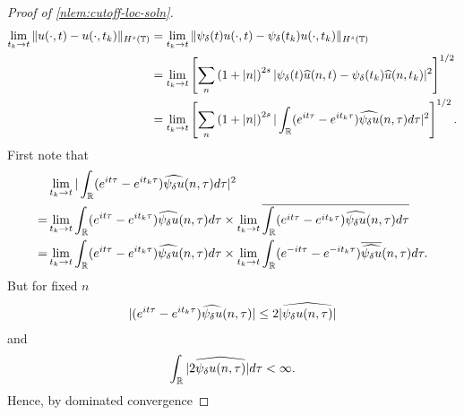 \begin{proof}[Proof of \cref{nlem:cutoff-loc-soln}]
%
%
\begin{equation}
  \label{ndm}
	\begin{split}
		\lim_{t_{k} \to t} \|u(\cdot, t) - u(\cdot, t_{k})\|_{H^s(\mathbb{T})} 
    & = \lim_{t_{k} \to t} \|\psi_{\delta}(t) u(\cdot, t) - \psi_{\delta}(t_{k}) u(\cdot, t_{k})\|_{H^s(\mathbb{T})} 
		\\
		& = \lim_{t_{k} \to t} \left[ \sum_{n}\left( 1 + | n |
    \right)^{2s} | \psi_{\delta}(t)  \widehat{u}(n, t) - \psi_{\delta}(t_{k}) \widehat{ u}(n, t_{k}) |^2 \right]^{1/2}
		\\
		& = \lim_{t_{k} \to t} \left[ \sum_{n} \left( 1 + | n |
    \right)^{2s} | \int_{\mathbb{R}} (e^{it \tau} - e^{it_{k} \tau})
    \widehat{\psi_{\delta} u}(n,
		\tau) d \tau |^2 \right]^{1/2}.
	\end{split}
\end{equation}
First note that
%
%
%
%
\begin{equation*}
\begin{split}
& \lim_{t_{k} \to t}  | \int_{\mathbb{R}} (e^{it \tau} - e^{it_{k} \tau})
    \widehat{\psi_{\delta} u}(n,
		\tau) d \tau |^2 
    \\
    = 
     & \lim_{t_{k} \to t}  \int_{\mathbb{R}} (e^{it \tau} - e^{it_{k} \tau})
    \widehat{\psi_{\delta} u}(n,
    \tau) d \tau \times \lim_{t_{k} \to t} \overline{\int_{\mathbb{R}} (e^{it \tau} - e^{it_{k} \tau})
    \widehat{\psi_{\delta} u}(n,
    \tau) d \tau }  
    \\
    = 
    &  \lim_{t_{k} \to t}  \int_{\mathbb{R}} (e^{it \tau} - e^{it_{k} \tau})
    \widehat{\psi_{\delta} u}(n,
    \tau) d \tau \times \lim_{t_{k} \to t} \int_{\mathbb{R}} (e^{-it \tau} - e^{-it_{k} \tau})
    \overline{\widehat{\psi_{\delta} u}}(n,
    \tau) d \tau.   
    \end{split}
\end{equation*}
%
%
But for fixed $n$ 
%
%
\begin{equation*}
\begin{split}
|(e^{it \tau} - e^{it_{k} \tau})  
    \widehat{\psi_{\delta} u}(n, \tau) | \le 2 |\widehat{\psi_{\delta} u(n, \tau)} |
\end{split}
\end{equation*}
%
%
and
%
%
%
\begin{equation*}
\begin{split}
  \int_{\mathbb{R}} |2 \widehat{\psi_{\delta} u(n, \tau)} | d \tau < \infty.
\end{split}
\end{equation*}
%
%
Hence, by dominated convergence
%

\end{proof}
